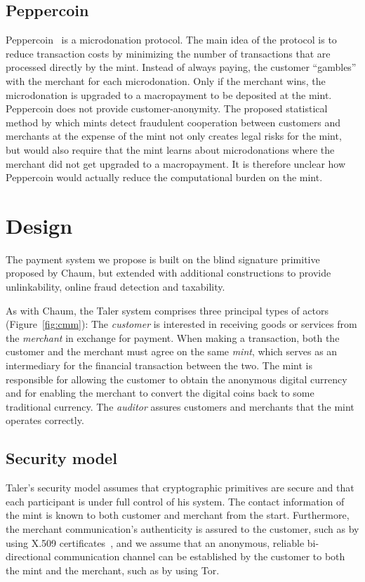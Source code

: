 \documentclass{llncs}
\begin{document}
\subsection{Peppercoin}

Peppercoin~\cite{rivest2004peppercoin} is a microdonation protocol.
The main idea of the protocol is to reduce transaction costs by
minimizing the number of transactions that are processed directly by
the mint.  Instead of always paying, the customer ``gambles'' with the
merchant for each microdonation.  Only if the merchant wins, the
microdonation is upgraded to a macropayment to be deposited at the
mint.  Peppercoin does not provide customer-anonymity.  The proposed
statistical method by which mints detect fraudulent cooperation between
customers and merchants at the expense of the mint not only creates
legal risks for the mint, but would also require that the mint learns
about microdonations where the merchant did not get upgraded to a
macropayment.  It is therefore unclear how Peppercoin would actually
reduce the computational burden on the mint.


\section{Design}

The payment system we propose is built on the blind signature
primitive proposed by Chaum, but extended with additional
constructions to provide unlinkability, online fraud detection and
taxability.

As with Chaum, the Taler system comprises three principal types of
actors (Figure~\ref{fig:cmm}): The \emph{customer} is interested in
receiving goods or services from the \emph{merchant} in exchange for
payment.  When making a transaction, both the customer and the
merchant must agree on the same \emph{mint}, which serves as an
intermediary for the financial transaction between the two.  The mint
is responsible for allowing the customer to obtain the anonymous
digital currency and for enabling the merchant to convert the
digital coins back to some traditional currency.  The \emph{auditor}
assures customers and merchants that the mint operates correctly.

\subsection{Security model}

Taler's security model assumes that cryptographic primitives are
secure and that each participant is under full control of his system.
The contact information of the mint is known to both customer and
merchant from the start.  Furthermore, the merchant communication's
authenticity is assured to the customer, such as by using X.509
certificates~\cite{rfc5280}, and we assume that an anonymous, reliable
bi-directional communication channel can be established by the
customer to both the mint and the merchant, such as by using Tor.
\end{document}
